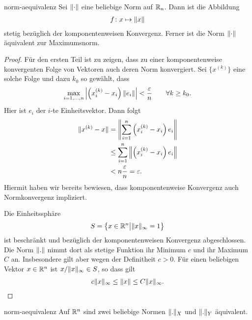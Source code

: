 \begin{Lemma}{norm-aequivalenz}
  Sei $\lVert\cdot\rVert$ eine beliebige Norm auf $\mathbb R_n$. Dann ist die Abbildung
  \begin{gather}
    f\colon x \mapsto \lVert x\rVert
  \end{gather}
  stetig bezüglich der komponentenweisen Konvergenz. Ferner ist die
  Norm $\lVert\cdot\rVert$ äquivalent zur Maximumsnorm.
\end{Lemma}

\begin{proof}
  Für den ersten Teil ist zu zeigen, dass zu einer komponentenweise
  konvergenten Folge von Vektoren auch deren Norm konvergiert. Sei
  $\{x^{(k)}\}$ eine solche Folge und dazu $k_0$ so gewählt, dass
  \begin{gather}
    \max_{i=1,\dots,n}\left\lvert\left(x_i^{(k)}-x_i\right) \lVert e_i\rVert\right\rvert
      < \frac{\varepsilon} n
    \qquad \forall k\ge k_0.
  \end{gather}
  Hier ist $e_i$ der $i$-te Einheitsvektor. Dann folgt
  \begin{align}
    \lVert x^{(k)}-x\rVert
    &= \left\lVert\sum_{i=1}^n \left(x_i^{(k)}-x_i\right) e_i\right\rVert
    \\
    &\le \sum_{i=1}^n \left\lVert\left(x_i^{(k)}-x_i\right) e_i\right\rVert
    \\
    & < n \frac{\varepsilon} n = \varepsilon.
  \end{align}
  Hiermit haben wir bereits bewiesen, dass komponentenweise Konvergenz
  auch Normkonvergenz impliziert.

Die \glqq{}Einheitssphäre\grqq{}
   \begin{gather}
     S = \bigl\{ x\in \mathbb R^n \big| \lVert x\rVert_\infty = 1 \bigr\}
   \end{gather}
   ist beschränkt und bezüglich der komponentenweisen Konvergenz
   abgeschlossen. Die Norm $\lVert.\rVert$ nimmt dort als stetige Funktion
   ihr Minimum $c$ und ihr Maximum $C$ an. Insbesondere gilt aber
   wegen der Definitheit $c > 0$. Für einen beliebigen Vektor
   $x\in \mathbb R^n$ ist $x/\lVert x\rVert_\infty \in S$, so dass gilt
   \begin{gather}
     c \lVert x\rVert_\infty \le \lVert x\rVert \le C \lVert x\rVert_\infty.
   \end{gather}
\end{proof}

\begin{Satz}{norm-aequivalenz}
  Auf $\mathbb R^n$ sind zwei beliebige Normen $\lVert.\rVert_X$ und $\lVert.\rVert_Y$ äquivalent.
\end{Satz}

